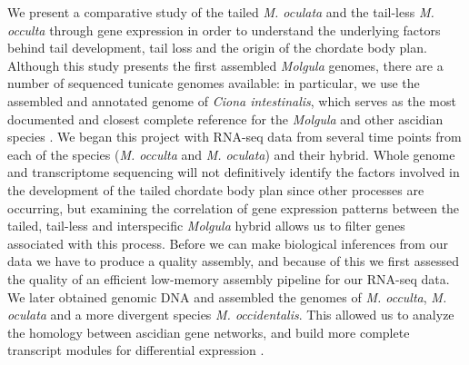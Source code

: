 We present a comparative study of the tailed \textit{M. oculata} and the tail-less \textit{M. occulta} through gene expression in order to understand the underlying factors behind tail development, tail loss and the origin of the chordate body plan. Although this study presents the first assembled \textit{Molgula} genomes, there are a number of sequenced tunicate genomes available: in particular, we use the assembled and annotated genome of \textit{Ciona intestinalis}, which serves as the most documented and closest complete reference for the \textit{Molgula} and other ascidian species \cite{dehal_draft_2002,satoh_ascidian_2003,satoh_ciona_2003}. We began this project with RNA-seq data from several time points from each of the species (\textit{M. occulta} and \textit{M. oculata}) and their hybrid. 
Whole genome and transcriptome sequencing will not definitively identify the factors involved in the development of the tailed chordate body plan since other processes are occurring, but examining the correlation of gene expression patterns between the tailed, tail-less and interspecific \textit{Molgula} hybrid allows us to filter genes associated with this process. Before we can make biological inferences from our data we have to produce a quality assembly, and because of this we first assessed the quality of an efficient low-memory assembly pipeline for our RNA-seq data.
We later obtained genomic DNA and assembled the genomes of \textit{M. occulta}, \textit{M. oculata} and a more divergent species \textit{M. occidentalis}. This allowed us to analyze the homology between ascidian gene networks, and build more complete transcript modules for differential expression \cite{vijay_challenges_2012}.

